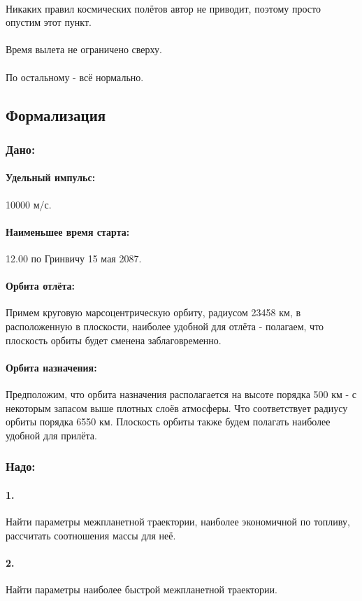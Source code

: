 \paragraph{}Никаких правил космических полётов автор не приводит, поэтому просто опустим этот пункт.
\paragraph{}Время вылета не ограничено сверху.
\paragraph{}По остальному - всё нормально.

\subsection{Формализация}
\subsubsection{Дано:}
\paragraph{Удельный импульс:} 10000 м/с.
\paragraph{Наименьшее время старта:} 12.00 по Гринвичу 15 мая 2087.
\paragraph{Орбита отлёта:} Примем круговую марсоцентрическую орбиту, радиусом 23458 км, в расположенную в плоскости, наиболее удобной для отлёта - полагаем, что плоскость орбиты будет сменена заблаговременно.
\paragraph{Орбита назначения:} Предположим, что орбита назначения располагается на высоте порядка 500 км - с некоторым запасом выше плотных слоёв атмосферы. Что соответствует радиусу орбиты порядка 6550 км. Плоскость орбиты также будем полагать наиболее удобной для прилёта.

\subsubsection{Надо:}
\paragraph{1.} Найти параметры межпланетной траектории, наиболее экономичной по топливу, рассчитать соотношения массы для неё.
\paragraph{2.} Найти параметры наиболее быстрой межпланетной траектории.